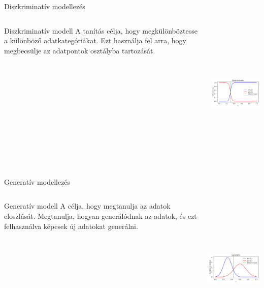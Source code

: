 \documentclass[english, aspectratio=169]{beamer}
\begin{document}
\begin{frame}{Diszkriminatív modellezés}
\begin{columns}
\begin{column}{.5\textwidth}
\begin{block}{Diszkriminatív modell}
A tanítás célja, hogy megkülönböztesse a különböző adatkategóriákat. Ezt használja fel arra, hogy megbecsülje az adatpontok osztályba tartozását.
\end{block}
\end{column}
\begin{column}{.5\textwidth}
\begin{center}
\includegraphics[width=7cm, height=7cm, keepaspectratio]{images/generative_1.png}
\end{center}
\end{column}
\end{columns}
\end{frame}

\begin{frame}{Generatív modellezés}
\begin{columns}
\begin{column}{.5\textwidth}
\begin{block}{Generatív modell}
A célja, hogy megtanulja az adatok eloszlását. Megtanulja, hogyan generálódnak az adatok, és ezt felhasználva képesek új adatokat generálni.
\end{block}
\end{column}
\begin{column}{.5\textwidth}
\begin{center}
\includegraphics[width=7cm, height=7cm, keepaspectratio]{images/generative_2.png}
\end{center}
\end{column}
\end{columns}
\end{frame}
\end{document}
